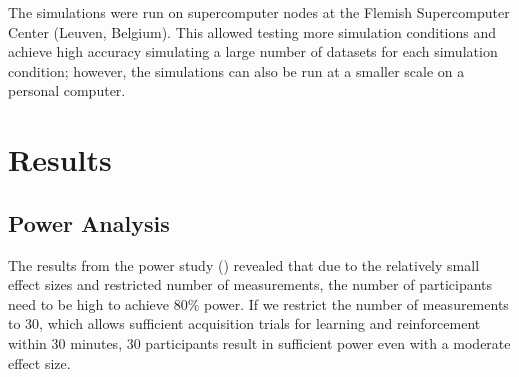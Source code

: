 \documentclass{jote-article}
\begin{document}
The simulations were run on supercomputer nodes at the Flemish Supercomputer Center (Leuven, Belgium). This allowed testing more simulation conditions and achieve high accuracy simulating a large number of datasets for each simulation condition; however, the simulations can also be run at a smaller scale on a personal computer.

\section{Results}

\subsection{Power Analysis}

The results from the power study () revealed that due to the relatively small effect sizes and restricted number of measurements, the number of participants need to be high to achieve 80\% power. If we restrict the number of measurements to 30, which allows sufficient acquisition trials for learning and reinforcement within 30 minutes, 30 participants result in sufficient power even with a moderate effect size.
\end{document}

